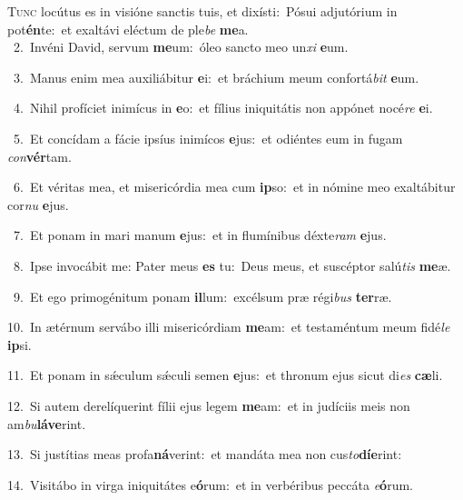 \lettrine{\initial\textcolor{\initialcolor}{T}}{unc} locútus es in visióne sanctis tuis, et dixísti:~\dagger Pósui adjutórium in pot\-\textbf{én}\-te:~\star et exaltávi eléctum de ple\textit{be} \textbf{me}\-a.\\
{\numbfont\textcolor{\numbcolor}{~2.}}~Invéni David, servum \textbf{me}\-um:~\star óleo sancto meo un\textit{xi} \textbf{e}\-um.\par
{\numbfont\textcolor{\numbcolor}{~3.}}~Manus enim mea auxiliábitur \textbf{e}\-i:~\star et bráchium meum confortá\textit{bit} \textbf{e}\-um.\par
{\numbfont\textcolor{\numbcolor}{~4.}}~Nihil profíciet inimícus in \textbf{e}\-o:~\star et fílius iniquitátis non appónet nocé\textit{re} \textbf{e}\-i.\par
{\numbfont\textcolor{\numbcolor}{~5.}}~Et concídam a fácie ipsíus inimícos \textbf{e}\-jus:~\star et odiéntes eum in fugam \textit{con}\-\textbf{vér}tam.\par
{\numbfont\textcolor{\numbcolor}{~6.}}~Et véritas mea, et misericórdia mea cum \textbf{ip}\-so:~\star et in nómine meo exaltábitur cor\textit{nu} \textbf{e}\-jus.\par
{\numbfont\textcolor{\numbcolor}{~7.}}~Et ponam in mari manum \textbf{e}\-jus:~\star et in flumínibus déxte\textit{ram} \textbf{e}\-jus.\par
{\numbfont\textcolor{\numbcolor}{~8.}}~Ipse invocábit me: Pater meus \textbf{es} tu:~\star Deus meus, et suscéptor salú\textit{tis} \textbf{me}\-æ.\par
{\numbfont\textcolor{\numbcolor}{~9.}}~Et ego primogénitum ponam \textbf{il}\-lum:~\star excélsum præ régi\textit{bus} \textbf{ter}\-ræ.\par
{\numbfont\textcolor{\numbcolor}{10.}}~In ætérnum servábo illi misericórdiam \textbf{me}\-am:~\star et testaméntum meum fidé\textit{le} \textbf{ip}\-si.\par
{\numbfont\textcolor{\numbcolor}{11.}}~Et ponam in sǽculum sǽculi semen \textbf{e}\-jus:~\star et thronum ejus sicut di\textit{es} \textbf{cæ}\-li.\par
{\numbfont\textcolor{\numbcolor}{12.}}~Si autem derelíquerint fílii ejus legem \textbf{me}\-am:~\star et in judíciis meis non am\-\textit{bu}\-\textbf{lá}\textbf{ve}rint.\par
{\numbfont\textcolor{\numbcolor}{13.}}~Si justítias meas profa\-\textbf{ná}\-verint:~\star et mandáta mea non cus\-\textit{to}\-\textbf{dí}\textbf{e}rint:\par
{\numbfont\textcolor{\numbcolor}{14.}}~Visitábo in virga iniquitátes e\-\textbf{ó}\-rum:~\star et in verbéribus peccáta \textit{e}\-\textbf{ó}rum.\par
